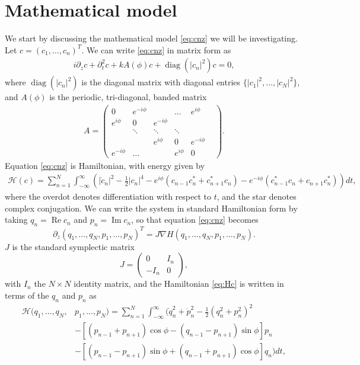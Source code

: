 \documentclass[11pt,reqno]{amsart}
\def\calH{{\mathcal H}}
\DeclareMathOperator{\diag}{diag}
\DeclareMathOperator{\RR}{Re}
\DeclareMathOperator{\II}{Im}
\begin{document}

\section{Mathematical model}\label{sec:model}

We start by discussing the mathematical model \cref{eq:cnz} we will be investigating. Let $c = (c_1, \dots, c_n)^T$. We can write \cref{eq:cnz} in matrix form as
\begin{align}\label{eq:cz}
i \partial_z c + \partial_t^2 c + k A(\phi) c + \diag\left(|c_n|^2\right)c = 0,
\end{align}
where $\diag\left(|c_n|^2\right)$ is the diagonal matrix with diagonal entries $\{|c_1|^2, \dots, |c_N|^2\}$, and $A(\phi)$ is the periodic, tri-diagonal, banded matrix
\begin{align}
A = \begin{pmatrix}
0 & e^{-i \phi} & & \dots & e^{i \phi} \\
e^{i \phi} & 0 & e^{-i \phi} & & & \\
& \ddots & \ddots & \ddots &  & \\
 & &e^{i \phi}  & 0 & e^{-i \phi}  \\
e^{-i \phi}& \dots & & e^{i \phi} & 0
\end{pmatrix}.
\end{align}
Equation \cref{eq:cnz} is Hamiltonian, with energy given by
\begin{align}\label{eq:Hc}
\calH(c) = \sum_{n=1}^N \int_{-\infty}^\infty 
\left(
|\dot{c}_n|^2 - \frac{1}{2}|c_n|^4 - e^{i\phi}( c_{n-1}c_n^* + c_{n+1}^* c_n) 
- e^{-i \phi}( c_{n-1}^*c_n + c_{n+1} c_n^*) \right) dt,
\end{align}
where the overdot denotes differentiation with respect to $t$, and the star denotes complex conjugation. We can write the system in standard Hamiltonian form by taking $q_n = \RR c_n$ and $p_n = \II c_n$, so that equation \cref{eq:cnz} becomes
\begin{equation}
\partial_z (q_1, \dots, q_N, p_1, \dots, p_N)^T
 = J \nabla H(q_1, \dots, q_N, p_1, \dots, p_N).
\end{equation}
$J$ is the standard symplectic matrix
\[
J = \begin{pmatrix}
0 & I_n \\ -I_n & 0
\end{pmatrix},
\]
with $I_n$ the $N \times N$ identity matrix, and the Hamiltonian \cref{eq:Hc} is written in terms of the $q_n$ and $p_n$ as
\begin{equation}\label{eq:Hqp}
\begin{aligned}
\calH(q_1, \dots, q_N, &p_1, \dots, p_N) = \sum_{n=1}^N \int_{-\infty}^\infty 
\Big(
\dot{q}_n^2 + \dot{p}_n^2 - \frac{1}{2}(q_n^2 + p_n^2)^2 \\
&- \left[(p_{n-1} + p_{n+1}) \cos\phi - (q_{n-1} - p_{n+1}) \sin \phi\right] p_n \\
&- \left[(p_{n-1} - p_{n+1}) \sin\phi + (q_{n-1} + p_{n+1}) \cos \phi\right] q_n
\Big) dt,
\end{aligned}
\end{equation}
\end{document}
